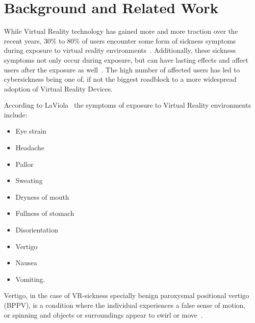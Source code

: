 \chapter{Background and Related Work}

While Virtual Reality technology has gained more and more traction over the recent years, 30\% to 80\% of users
encounter some form of sickness symptoms during exposure to virtual reality environments~\cite{Rebenitsch2016}.
Additionally, these sickness symptoms not only occur during exposure, but can have lasting effects and affect users
after the exposure as well~\cite{LaViola2000}.
The high number of affected users has led to cybersickness being one of, if not the biggest roadblock to a more
widespread adoption of Virtual Reality Devices.

According to LaViola~\cite{LaViola2000} the symptoms of exposure to Virtual Reality environments include:
\begin{itemize}
    \item Eye strain
    \item Headache
    \item Pallor
    \item Sweating
    \item Dryness of mouth
    \item Fullness of stomach
    \item Disorientation
    \item Vertigo
    \item Nausea
    \item Vomiting.
\end{itemize}
Vertigo, in the case of VR-sickness specially benign paroxysmal positional vertigo (BPPV), is a condition where the
individual experiences a false sense of motion, or spinning and objects or surroundings appear to swirl or move~\cite{Post2010}.


